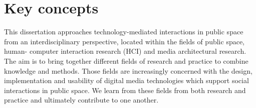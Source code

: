 



\newpage
 
\section{Key concepts}

This dissertation approaches technology-mediated interactions in public space from an interdisciplinary perspective, located within the fields of public space, human- computer interaction research (HCI) and media architectural research. 
The aim is to bring together different fields of research and practice to combine knowledge and methods.
Those fields are increasingly concerned with the design, implementation and usability of digital media technologies which support social interactions in public space.
We learn from these fields from both research and practice and ultimately contribute to one another.

